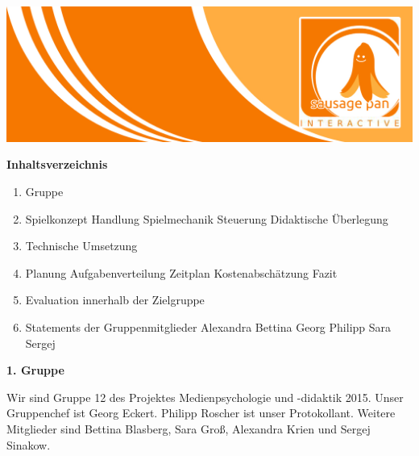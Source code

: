 \documentclass[10pt,a4paper,notitlepage]{report}
\author{Sausage Pan}
\begin{document}
	\newcommand{\Eins}[1]{\color{orange}\textbf{{\Large#1}}} %
	\newcommand{\Zwei}[1]{\color{orange}\textbf{{\large#1}}} %
	\newcommand{\Drei}[1]{\color{orange}{\normalsize#1}} %
	\newcommand{\Text}{\color{schwarz}} %
	\newcommand{\Fusszeile}
	{\textit{{\footnotesize Eckert, Georg - Roscher, Philipp - Krien, Alexandra - Sinakow, Sergej - Blasberg, Bettina - Groß, Stephanie Sara}}} %
	\marginpar{\vspace{3.0mm} \color{orange}\rule{0.8mm}{53.3mm} \\[3mm] \color{hellorange}\rule{0.8mm}{170mm}}
	\begin{center}
		\includegraphics[width=160mm]{header2}
	\end{center}
	\par\bigskip
	\Eins{Inhaltsverzeichnis}\\
	\Text
	\begin{enumerate}
		\item Gruppe
		\item Spielkonzept
		 Handlung
		 Spielmechanik
		 Steuerung
		 Didaktische Überlegung
		\item Technische Umsetzung
		\item Planung
		 Aufgabenverteilung
		 Zeitplan
		 Kostenabschätzung
		 Fazit
		\item Evaluation innerhalb der Zielgruppe
		\item Statements der Gruppenmitglieder
		 Alexandra
		 Bettina
		 Georg
		 Philipp
		 Sara
		 Sergej
	\end{enumerate}	
		\clearpage
		\marginpar{\vspace{3.0mm} \color{orange}\rule{0.8mm}{53.3mm} \\[3mm] \color{hellorange}\rule{0.8mm}{170mm}}
	\par\bigskip
	\Eins{1. Gruppe}\\\par\medskip\Text
	Wir sind Gruppe 12 des Projektes Medienpsychologie und -didaktik 2015. Unser Gruppenchef ist Georg Eckert. 
	Philipp Roscher ist unser Protokollant. Weitere Mitglieder sind Bettina Blasberg, Sara Groß, Alexandra Krien und Sergej Sinakow.\\\par\smallskip
\end{document}
